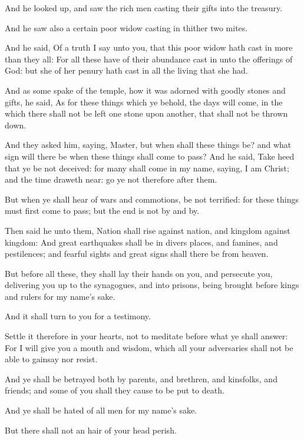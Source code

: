 \Chapter
\Verse And he looked up, and saw the rich men casting their gifts into the treasury.

\Verse And he saw also a certain poor widow casting in thither two mites.

\Verse And he said, Of a truth I say unto you, that this poor widow hath cast in more than they all: \Verse For all these have of their abundance cast in unto the offerings of God: but she of her penury hath cast in all the living that she had.

\Verse And as some spake of the temple, how it was adorned with goodly stones and gifts, he said, \Verse As for these things which ye behold, the days will come, in the which there shall not be left one stone upon another, that shall not be thrown down.

\Verse And they asked him, saying, Master, but when shall these things be?  and what sign will there be when these things shall come to pass?  \Verse And he said, Take heed that ye be not deceived: for many shall come in my name, saying, I am Christ; and the time draweth near: go ye not therefore after them.

\Verse But when ye shall hear of wars and commotions, be not terrified: for these things must first come to pass; but the end is not by and by.

\Verse Then said he unto them, Nation shall rise against nation, and kingdom against kingdom: \Verse And great earthquakes shall be in divers places, and famines, and pestilences; and fearful sights and great signs shall there be from heaven.

\Verse But before all these, they shall lay their hands on you, and persecute you, delivering you up to the synagogues, and into prisons, being brought before kings and rulers for my name's sake.

\Verse And it shall turn to you for a testimony.

\Verse Settle it therefore in your hearts, not to meditate before what ye shall answer: \Verse For I will give you a mouth and wisdom, which all your adversaries shall not be able to gainsay nor resist.

\Verse And ye shall be betrayed both by parents, and brethren, and kinsfolks, and friends; and some of you shall they cause to be put to death.

\Verse And ye shall be hated of all men for my name's sake.

\Verse But there shall not an hair of your head perish.

